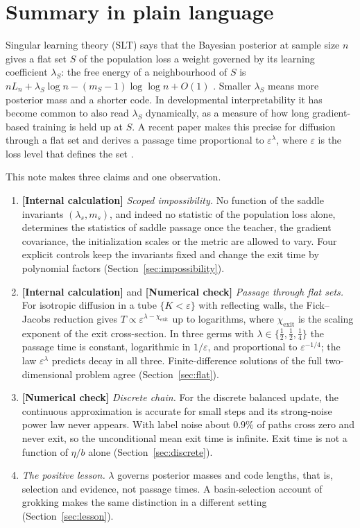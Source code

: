 \documentclass[11pt,a4paper]{article}
\newcommand{\eps}{\varepsilon}
\newcommand{\chiexit}{\chi_{\mathrm{exit}}}
\newcommand{\evl}[2]{{\small\bfseries\color{#1}[#2]}}
\newcommand{\LCalc}{\evl{ccalc}{Internal calculation}}
\newcommand{\LNum}{\evl{cnum}{Numerical check}}
\begin{document}
\section{Summary in plain language}
\label{sec:summary}

Singular learning theory (SLT) says that the Bayesian posterior at sample
size $n$ gives a flat set $S$ of the population loss a weight governed by
its learning coefficient $\lambda_S$: the free energy of a neighbourhood of
$S$ is $nL_n+\lambda_S\log n-(m_S-1)\log\log n+O(1)$ \cite{watanabe2009}.
Smaller $\lambda_S$ means more posterior mass and a shorter code. In
developmental interpretability it has become common to also read
$\lambda_S$ dynamically, as a measure of how long gradient-based training
is held up at $S$. A recent paper makes this precise for diffusion through
a flat set and derives a passage time proportional to $\eps^{\lambda}$,
where $\eps$ is the loss level that defines the set \cite{hennick2026}.

This note makes three claims and one observation.

\begin{enumerate}
\item \LCalc{} \emph{Scoped impossibility.} No function of the saddle
invariants $(\lambda_s,m_s)$, and indeed no statistic of the population loss
alone, determines the statistics of saddle passage once the teacher, the
gradient covariance, the initialization scales or the metric are allowed to
vary. Four explicit controls keep the invariants fixed and change the exit
time by polynomial factors (Section~\ref{sec:impossibility}).
\item \LCalc{} and \LNum{} \emph{Passage through flat sets.} For isotropic
diffusion in a tube $\{K<\eps\}$ with reflecting walls, the Fick--Jacobs
reduction gives $T\propto\eps^{\lambda-\chiexit}$ up to logarithms, where
$\chiexit$ is the scaling exponent of the exit cross-section. In three
germs with $\lambda\in\{\tfrac12,\tfrac12,\tfrac14\}$ the passage time is
constant, logarithmic in $1/\eps$, and proportional to $\eps^{-1/4}$; the
law $\eps^\lambda$ predicts decay in all three. Finite-difference solutions
of the full two-dimensional problem agree (Section~\ref{sec:flat}).
\item \LNum{} \emph{Discrete chain.} For the discrete balanced update, the
continuous approximation is accurate for small steps and its strong-noise
power law never appears. With label noise about $0.9\%$ of paths cross zero
and never exit, so the unconditional mean exit time is infinite. Exit time
is not a function of $\eta/b$ alone (Section~\ref{sec:discrete}).
\item \emph{The positive lesson.} $\lambda$ governs posterior masses and code
lengths, that is, selection and evidence, not passage times. A
basin-selection account of grokking makes the same distinction in a
different setting \cite{cullen2026} (Section~\ref{sec:lesson}).
\end{enumerate}
\end{document}
